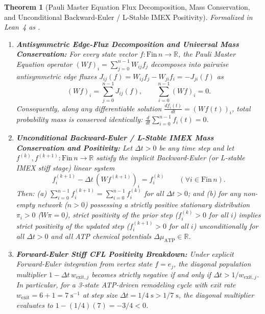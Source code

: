 \documentclass[11pt,a4paper]{article}
\newtheorem{theorem}{Theorem}[section]
\theoremstyle{definition}
\begin{document}
\begin{theorem}[Pauli Master Equation Flux Decomposition, Mass Conservation, and Unconditional Backward-Euler / L-Stable IMEX Positivity]
\label{thm:master_eq_imex}
Formalized in Lean~4 as \texttt{}.
\begin{enumerate}
  \item \textbf{Antisymmetric Edge-Flux Decomposition and Universal Mass Conservation:} For every state vector $f : \mathrm{Fin}\,n \to \mathbb{R}$, the Pauli Master Equation operator $(Wf)_i = \sum_{j=0}^{n-1} W_{ij} f_j$ decomposes into pairwise antisymmetric edge fluxes $J_{ij}(f) = W_{ij}f_j - W_{ji}f_i = -J_{ji}(f)$ as
  \begin{equation}
    (Wf)_i = \sum_{j=0}^{n-1} J_{ij}(f), \qquad \sum_{i=0}^{n-1} (Wf)_i = 0.
  \end{equation}
  Consequently, along any differentiable solution $\frac{df_i(t)}{dt} = (Wf(t))_i$, total probability mass is conserved identically: $\frac{d}{dt}\sum_{i=0}^{n-1} f_i(t) = 0$.
  \item \textbf{Unconditional Backward-Euler / L-Stable IMEX Mass Conservation and Positivity:} Let $\Delta t > 0$ be any time step and let $f^{(k)}, f^{(k+1)} : \mathrm{Fin}\,n \to \mathbb{R}$ satisfy the implicit Backward-Euler (or L-stable IMEX stiff stage) linear system
  \begin{equation}
    f_i^{(k+1)} - \Delta t\,(W f^{(k+1)})_i = f_i^{(k)} \qquad (\forall i \in \mathrm{Fin}\,n).
  \end{equation}
  Then: (a) $\sum_{i=0}^{n-1} f_i^{(k+1)} = \sum_{i=0}^{n-1} f_i^{(k)}$ for all $\Delta t > 0$; and (b) for any non-empty network ($n > 0$) possessing a strictly positive stationary distribution $\pi_i > 0$ ($W\pi = 0$), strict positivity of the prior step ($f_i^{(k)} > 0$ for all $i$) implies strict positivity of the updated step ($f_i^{(k+1)} > 0$ for all $i$) unconditionally for all $\Delta t > 0$ and all ATP chemical potentials $\Delta\mu_{\mathrm{ATP}} \in \mathbb{R}$.
  \item \textbf{Forward-Euler Stiff CFL Positivity Breakdown:} Under explicit Forward-Euler integration from vertex state $f = e_j$, the diagonal population multiplier $1 - \Delta t\,w_{\mathrm{exit},j}$ becomes strictly negative if and only if $\Delta t > 1/w_{\mathrm{exit},j}$. In particular, for a 3-state ATP-driven remodeling cycle with exit rate $w_{\mathrm{exit}} = 6 + 1 = 7\;\mathrm{s}^{-1}$ at step size $\Delta t = 1/4\;\mathrm{s} > 1/7\;\mathrm{s}$, the diagonal multiplier evaluates to $1 - (1/4)(7) = -3/4 < 0$.
\end{enumerate}
\end{theorem}
\end{document}
